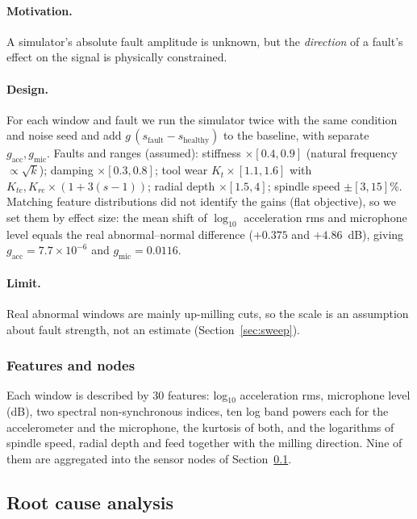 \documentclass[11pt]{article}
\begin{document}
\paragraph{Motivation.} A simulator's absolute fault amplitude is unknown, but the \emph{direction} of a fault's effect on the signal is physically constrained.
\paragraph{Design.} For each window and fault we run the simulator twice with the same condition and noise seed and add $g\,(s_\text{fault}-s_\text{healthy})$ to the baseline, with separate $g_\text{acc},g_\text{mic}$. Faults and ranges (assumed): stiffness $\times[0.4,0.9]$ (natural frequency $\propto\sqrt{k}$); damping $\times[0.3,0.8]$; tool wear $K_t\times[1.1,1.6]$ with $K_{te},K_{re}\times(1+3(s-1))$; radial depth $\times[1.5,4]$; spindle speed $\pm[3,15]\%$. Matching feature distributions did not identify the gains (flat objective), so we set them by effect size: the mean shift of $\log_{10}$ acceleration rms and microphone level equals the real abnormal--normal difference ($+0.375$ and $+4.86$~dB), giving $g_\text{acc}=7.7\times10^{-6}$ and $g_\text{mic}=0.0116$.
\paragraph{Limit.} Real abnormal windows are mainly up-milling cuts, so the scale is an assumption about fault strength, not an estimate (Section~\ref{sec:sweep}).

\subsubsection{Features and nodes}
Each window is described by 30 features: log$_{10}$ acceleration rms, microphone level (dB), two spectral non-synchronous indices, ten log band powers each for the accelerometer and the microphone, the kurtosis of both, and the logarithms of spindle speed, radial depth and feed together with the milling direction. Nine of them are aggregated into the sensor nodes of Section~\ref{sec:rca}.

\subsection{Root cause analysis}\label{sec:rca}
\end{document}
